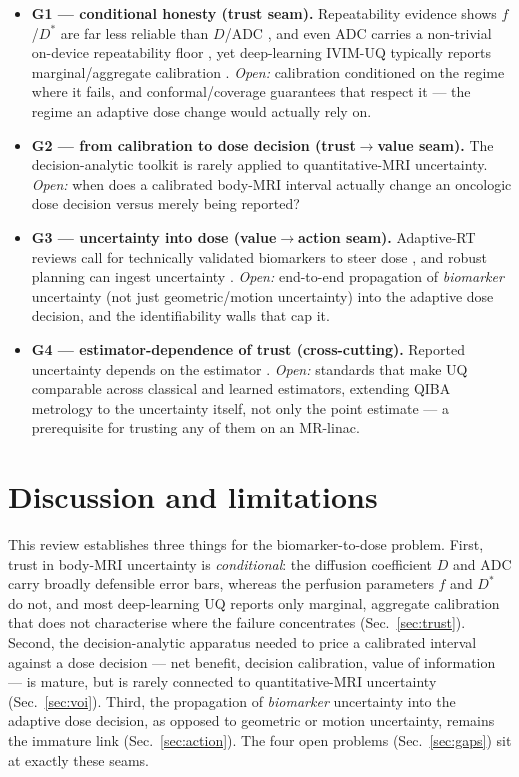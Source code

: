 \documentclass[review,number]{elsarticle}
\newcommand{\Dstar}{D^{*}}
\begin{document}
\begin{itemize}
  \item \textbf{G1 --- conditional honesty (trust seam).} Repeatability evidence shows
    $f$/$\Dstar$ are far less reliable than $D$/ADC
    \cite{sun2017,yang2019,simchick2024}, and even ADC carries a non-trivial on-device
    repeatability floor \cite{eijkelenkamp2025,habrich2022}, yet deep-learning IVIM-UQ
    typically reports marginal/aggregate calibration \cite{casali2025}. \emph{Open:} calibration
    conditioned on the regime where it fails, and conformal/coverage guarantees that
    respect it \cite{angelopoulos2021,ovadia2019} --- the regime an adaptive dose change
    would actually rely on.
  \item \textbf{G2 --- from calibration to dose decision (trust$\rightarrow$value seam).}
    The decision-analytic toolkit \cite{vickers2006,zhao2021} is rarely applied to
    quantitative-MRI uncertainty. \emph{Open:} when does a calibrated body-MRI interval
    actually change an oncologic dose decision versus merely being reported?
  \item \textbf{G3 --- uncertainty into dose (value$\rightarrow$action seam).}
    Adaptive-RT reviews call for technically validated biomarkers to steer dose
    \cite{otazo2021,vanhoudt2021qib}, and robust planning can ingest uncertainty
    \cite{unkelbach2018}. \emph{Open:} end-to-end propagation of \emph{biomarker}
    uncertainty (not just geometric/motion uncertainty) into the adaptive dose decision,
    and the identifiability walls that cap it.
  \item \textbf{G4 --- estimator-dependence of trust (cross-cutting).} Reported
    uncertainty depends on the estimator \cite{barbieri2016,barbieri2020}. \emph{Open:}
    standards that make UQ comparable across classical and learned estimators, extending
    QIBA metrology \cite{raunig2015,sullivan2015} to the uncertainty itself, not only the
    point estimate --- a prerequisite for trusting any of them on an MR-linac.
\end{itemize}

\section{Discussion and limitations}
\label{sec:scope-honest}

This review establishes three things for the biomarker-to-dose problem. First, trust in
body-MRI uncertainty is \emph{conditional}: the diffusion coefficient $D$ and ADC carry
broadly defensible error bars, whereas the perfusion parameters $f$ and $\Dstar$ do not,
and most deep-learning UQ reports only marginal, aggregate calibration that does not
characterise where the failure concentrates (Sec.~\ref{sec:trust}). Second, the
decision-analytic apparatus needed to price a calibrated interval against a dose
decision --- net benefit, decision calibration, value of information --- is mature, but
is rarely connected to quantitative-MRI uncertainty (Sec.~\ref{sec:voi}). Third, the
propagation of \emph{biomarker} uncertainty into the adaptive dose decision, as opposed
to geometric or motion uncertainty, remains the immature link (Sec.~\ref{sec:action}).
The four open problems (Sec.~\ref{sec:gaps}) sit at exactly these seams.
\end{document}
